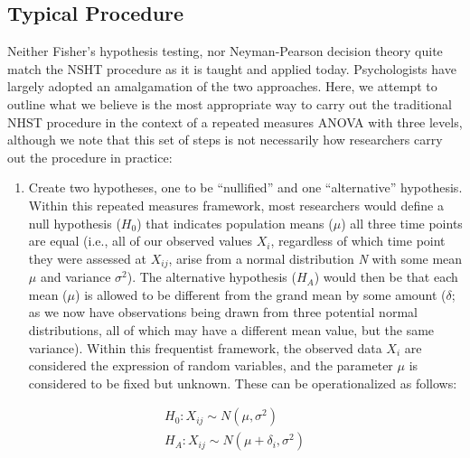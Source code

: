 \documentclass[,man, mask]{apa6}
\providecommand{\tightlist}{%
  \setlength{\itemsep}{0pt}\setlength{\parskip}{0pt}}
\begin{document}
\hypertarget{typical-procedure}{%
\subsection{Typical Procedure}\label{typical-procedure}}

Neither Fisher's hypothesis testing, nor Neyman-Pearson decision theory quite match the NSHT procedure as it is taught and applied today. Psychologists have largely adopted an amalgamation of the two approaches. Here, we attempt to outline what we believe is the most appropriate way to carry out the traditional NHST procedure in the context of a repeated measures ANOVA with three levels, although we note that this set of steps is not necessarily how researchers carry out the procedure in practice:

\begin{enumerate}
\def\labelenumi{\arabic{enumi})}
\tightlist
\item
  Create two hypotheses, one to be \enquote{nullified} and one \enquote{alternative} hypothesis. Within this repeated measures framework, most researchers would define a null hypothesis (\(H_0\)) that indicates population means (\(\mu\)) all three time points are equal (i.e., all of our observed values \(X_{i}\), regardless of which time point they were assessed at \(X_{ij}\), arise from a normal distribution \emph{N} with some mean \(\mu\) and variance \(\sigma^2\)). The alternative hypothesis (\(H_A\)) would then be that each mean (\(\mu\)) is allowed to be different from the grand mean by some amount (\(\delta\); as we now have observations being drawn from three potential normal distributions, all of which may have a different mean value, but the same variance). Within this frequentist framework, the observed data \(X_{i}\) are considered the expression of random variables, and the parameter \(\mu\) is considered to be fixed but unknown. These can be operationalized as follows:
\end{enumerate}

\[
\begin{aligned}
  H_0: X_{ij} \sim N(\mu, \sigma^2) \\
  H_A: X_{ij} \sim N(\mu + \delta_i, \sigma^2)
\end{aligned}
\]
\end{document}
